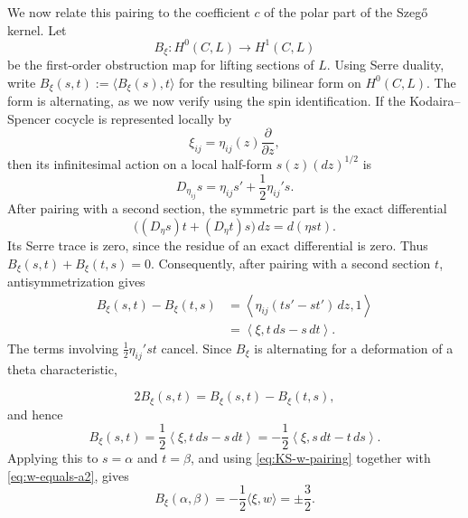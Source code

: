 \documentclass[11pt]{article}
\begin{document}
We now relate this pairing to the coefficient $c$ of the polar part
of the Szeg\H{o} kernel. Let
\begin{equation*}
B_\xi:H^0(C,L)\longrightarrow H^1(C,L)
\end{equation*}
be the first-order obstruction map for lifting sections of $L$.
{Using Serre duality, write
$B_\xi(s,t):=\langle B_\xi(s),t\rangle$ for the resulting bilinear form
on $H^0(C,L)$.}
{The form is alternating, as we now verify using the spin identification.}
If the Kodaira--Spencer cocycle is represented locally by
\begin{equation*}
\xi_{ij}=\eta_{ij}(z)\frac{\partial}{\partial z},
\end{equation*}
then its infinitesimal action on a local half-form
$s(z)(dz)^{1/2}$ is
\begin{equation*}
D_{\eta_{ij}}s
=
\eta_{ij}s'+\frac12\eta_{ij}'s.
\end{equation*}
{After pairing with a second section, the symmetric part is the
exact differential
\[
\bigl((D_\eta s)t+(D_\eta t)s\bigr)\,dz=d(\eta st).
\]
Its Serre trace is zero, since the residue of an exact differential is
zero. Thus $B_\xi(s,t)+B_\xi(t,s)=0$.}
Consequently, after pairing with a second section $t$,
antisymmetrization gives
\begin{align*}
B_\xi(s,t)-B_\xi(t,s)
&=
\left\langle
\eta_{ij}(ts'-st'){\,dz},1
\right\rangle\\
&=
\left\langle
\xi,t\,ds-s\,dt
\right\rangle.
\end{align*}
The terms involving $\frac12\eta_{ij}'st$ cancel. Since $B_\xi$
is alternating for a deformation of a theta characteristic,


\begin{equation*}
2B_\xi(s,t)=B_\xi(s,t)-B_\xi(t,s),
\end{equation*}
and hence
\begin{equation}
\label{eq:obstruction-wronskian-exact}
{B_\xi(s,t)
=
\frac12\left\langle\xi,t\,ds-s\,dt\right\rangle
=
-\frac12\left\langle\xi,s\,dt-t\,ds\right\rangle.}
\end{equation}
Applying this to $s=\alpha$ and $t=\beta$, and using
\eqref{eq:KS-w-pairing} together with
\eqref{eq:w-equals-a2}, gives
\begin{equation}
\label{eq:B-alpha-beta}
{B_\xi(\alpha,\beta)
=-\frac12\langle\xi,w\rangle
=\pm\frac32.}
\end{equation}
\end{document}

